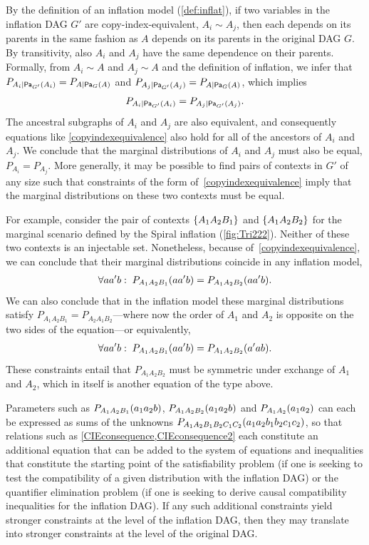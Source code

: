 \documentclass[aps,english,superscriptaddress,onecolumn,twoside,longbibliography,pra,floatfix,fleqn,nofootinbib]{revtex4-1}%
\theoremstyle{definition}
\newcounter{example}[section]
\newcommand{\p}[2][]{{P_{#1}}\parenths{#2}}
\newcommand{\pfunc}[1]{P_{#1}}
\newcommand{\Pa}[2][]{{\mathsf{Pa}_{#1}}\parenths{#2}}
\DeclarePairedDelimiter{\parenths}{\lparen}{\rparen}
\DeclarePairedDelimiter{\braces}{\lbrace}{\rbrace}
\newcommand{\brackets}[1]{\braces*{#1}}
\begin{document}
By the definition of an inflation model (\cref{def:inflat}), if two variables in the inflation DAG $G'$ are copy-index-equivalent, $A_i \sim A_j$, then each depends on its parents in the same fashion as $A$ depends on its parents in the original DAG $G$. By transitivity, also $A_i$ and $A_j$ have the same dependence on their parents.  Formally, from $A_i \sim A$ and $A_j \sim A$ and the definition of inflation, we infer that $\pfunc{A_i| \Pa[G']{A_i}}=\pfunc{A|\Pa[G]{A}}$ and $\pfunc{A_j| \Pa[G']{A_j}}=\pfunc{A|\Pa[G]{A}}$, which implies
\begin{align}\label{copyindexequivalence}
\pfunc{A_i| \Pa[G']{A_i}}=\pfunc{A_j|\Pa[G']{A_j}}.
 \end{align}
The ancestral subgraphs of $A_i$ and $A_j$ are also equivalent, and consequently equations like \cref{copyindexequivalence} also hold for all of the ancestors of $A_i$ and $A_j$. We conclude that  the marginal distributions of $A_i$ and $A_j$ must also be equal, $\pfunc{A_i}=\pfunc{A_j}$.
More generally, it may be possible to find pairs of contexts in $G'$ of any size such that constraints of the form of~\cref{copyindexequivalence} imply that the marginal distributions on these two contexts must be equal. 

For example, consider the pair of contexts $\brackets{A_1 A_2 B_1}$ and $\brackets{A_1 A_2 B_2}$ for the marginal scenario defined by the Spiral inflation (\cref{fig:Tri222}). Neither of these two contexts is an injectable set.  Nonetheless, because of~\cref{copyindexequivalence}, we can conclude that their marginal distributions coincide in any inflation model,
\begin{align}\label{CIEconsequence}
\forall{a a' b}:\;\p[A_1 A_2 B_1]{a a' b} = \p[A_1 A_2 B_2]{a a' b}.
\end{align}
We can also conclude that in the inflation model these marginal distributions satisfy  $P_{A_1 A_2 B_1}=P_{A_2 A_1 B_2}$---where now the order of $A_1$ and $A_2$ is opposite on the two sides of the equation---or equivalently, 
\begin{align}\label{CIEconsequence2}
\forall{a a' b}:\;\p[A_1 A_2 B_1]{a a' b} = \p[A_1 A_2 B_2]{a' a b}.
\end{align}
These constraints entail that $P_{A_1 A_2 B_2}$ must be symmetric under exchange of $A_1$ and $A_2$, which in itself is another equation of the type above.

Parameters such as $\p[A_1 A_2 B_1]{a_1 a_2 b}$, $\p[A_1 A_2 B_2]{a_1 a_2 b}$ and $\p[A_1 A_2]{a_1 a_2}$ can each be expressed as sums of the unknowns $\p[A_1 A_2 B_1 B_2 C_1 C_2]{a_1 a_2 b_1 b_2 c_1 c_2}$, so that relations such as \cref{CIEconsequence,CIEconsequence2} each constitute an additional equation that can be added to the system of equations and inequalities that constitute the starting point of the satisfiability problem (if one is seeking to test the compatibility of a given distribution with the inflation DAG) or the quantifier elimination problem (if one is seeking to derive causal compatibility inequalities for the inflation DAG).  If any such additional constraints yield stronger constraints at the level of the inflation DAG, then they may translate into stronger constraints at the level of the original DAG.
\end{document}
